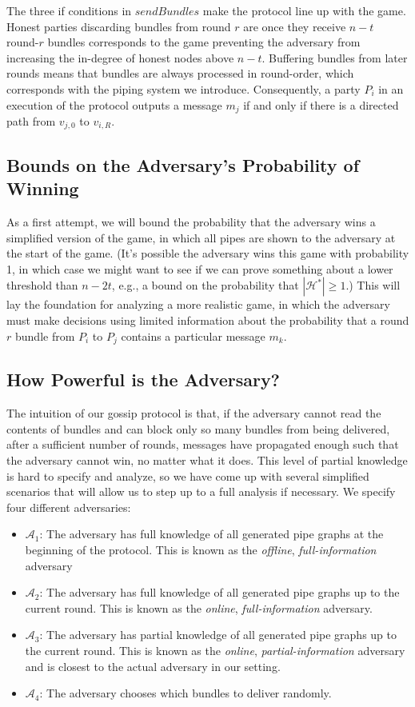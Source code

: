 \documentclass{article}
\begin{document}
The three if conditions in $sendBundles$ make the protocol line up with the game. Honest parties discarding bundles from round $r$ are once they receive $n - t$ round-$r$ bundles corresponds to the game preventing the adversary from increasing the in-degree of honest nodes above $n - t$. Buffering bundles from later rounds means that bundles are always processed in round-order, which corresponds with the piping system we introduce. Consequently,
a party $P_i$ in an execution of the protocol
outputs a message $m_j$ if and only if there is a directed path from $v_{j,0}$
to $v_{i,R}$.

\subsection{Bounds on the Adversary's Probability of Winning}
As a first attempt, we will bound the probability that the adversary wins
a simplified version of the game, in which
all pipes are shown to the adversary at the start of the game.
(It's possible the adversary wins this game with probability 1, in which case
we might want to see if we can prove something about a lower threshold than $n-2t$,
e.g., a bound on the probability that $|\mathcal H^*|\geq1$.)
This will lay the foundation for analyzing a more realistic game, in which
the adversary must make decisions using limited information about the probability
that a round $r$ bundle from $P_i$ to $P_j$ contains a particular message $m_k$.

\subsection{How Powerful is the Adversary?}
The intuition of our gossip protocol is that, if the adversary cannot read the contents of bundles and can block only so many bundles from being delivered, after a sufficient number of rounds, messages have propagated enough such that the adversary cannot win, no matter what it does. This level of partial knowledge is hard to specify and analyze, so we have come up with several simplified scenarios that will allow us to step up to a full analysis if necessary. We specify four different adversaries:
\begin{itemize}
    \item $\mathcal A_1$: The adversary has full knowledge of all generated pipe graphs at the beginning of the protocol. This is known as the \emph{offline}, \emph{full-information} adversary
    \item $\mathcal A_2$: The adversary has full knowledge of all generated pipe graphs up to the current round. This is known as the \emph{online}, \emph{full-information} adversary.
    \item $\mathcal A_3$: The adversary has partial knowledge of all generated pipe graphs up to the current round. This is known as the \emph{online}, \emph{partial-information} adversary and is closest to the actual adversary in our setting.
    \item $\mathcal A_4$: The adversary chooses which bundles to deliver randomly.
\end{itemize}
\end{document}
